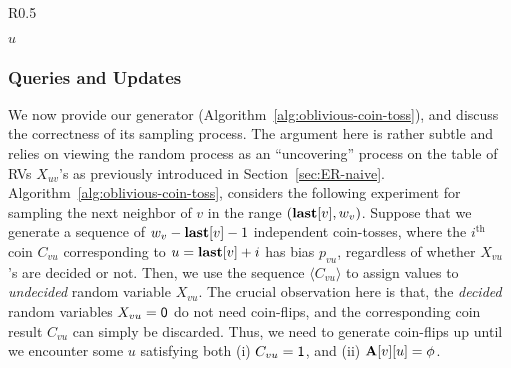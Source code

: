 \begin{wrapfigure}[15]{R}{0.5\textwidth}
\vspace{-2em}
\begin{framed}
    \renewcommand\figurename{Algorithm}
    \caption{Sampling }
    \label{alg:oblivious-coin-toss}
    \begin{algorithmic}[1]
            \State{$w_v \gets \min \{(P_v \cap (u, n]) \cup \{n+1\}\}$}
            \EndWhile
            \EndIf
            \State \Return $u$
        \EndProcedure
    \end{algorithmic}
\end{framed}
\end{wrapfigure}



\subsubsection{Queries and Updates}\label{sec:nn-correctness}
We now provide our generator (Algorithm~\ref{alg:oblivious-coin-toss}), and discuss the correctness of its sampling process. The argument here is rather subtle and relies on viewing the random process as an ``uncovering'' process on the table of RVs $X_{uv}$'s as previously introduced in Section~\ref{sec:ER-naive}.
Algorithm~\ref{alg:oblivious-coin-toss}, considers the following experiment for sampling the next neighbor of $v$ in the range $(\mathbf{last}[v],w_v)$.
Suppose that we generate a sequence of $w_v-\mathbf{last}[v]-1$ independent coin-tosses,
where the $i^\textrm{th}$ coin $C_{vu}$ corresponding to $u = \mathbf{last}[v]+i$ has bias $p_{vu}$,
regardless of whether $X_{vu}$'s are decided or not.
Then, we use the sequence $\langle C_{vu} \rangle$ to assign values to \emph{undecided} random variable $X_{vu}$.
The crucial observation here is that, the \emph{decided} random variables $X_{vu} = \mathsf{0}$ do not need coin-flips, and the corresponding coin result $C_{vu}$ can simply be discarded.
Thus, we need to generate coin-flips up until we encounter some $u$ satisfying
both (i) $C_{vu} = \mathsf{1}$, and (ii) $\mathbf{A}[v][u] = \phi$.



